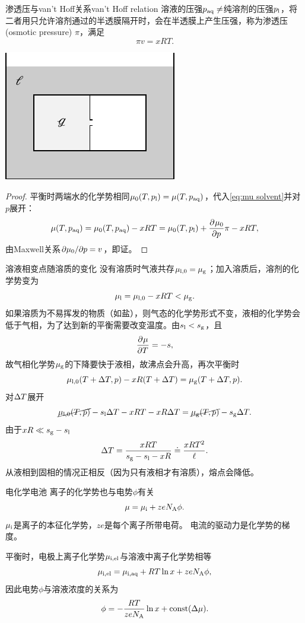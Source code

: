 \begin{theorem}
	{渗透压与van't Hoff关系}{van't Hoff relation}
	溶液的压强$p_{\mathrm{aq}}\neq$纯溶剂的压强$p_{\mathrm{l}}$，将二者用只允许溶剂通过的半透膜隔开时，会在半透膜上产生压强，称为渗透压(osmotic pressure) $\pi$，满足
	\begin{equation}
		\label{eq:van't Hoff}
		\pi v=xRT.
	\end{equation}
	\begin{center}
		\includegraphics[page=5]{figures/tikz/layouts.pdf}
	\end{center}
\end{theorem}

\begin{proof}
	平衡时两端水的化学势相同$\mu_0(T,p_{\mathrm{l}})=\mu(T,p_{\mathrm{aq}})$，代入\eqref{eq:mu solvent}并对$p$展开：
	\[
		\mu(T,p_{\mathrm{aq}})=\mu_0(T,p_{\mathrm{aq}})-xRT=\mu_0(T,p_{\mathrm{l}})+\frac{\partial^{{}}\mu_0}{\partial{p}^{{}}}\pi-xRT,
	\]
	由Maxwell关系$\partial\mu_0/\partial p=v$，即证。
\end{proof}

\begin{example}
	{溶液相变点随溶质的变化}{}
	没有溶质时气液共存$\mu_{\mathrm{l},0}=\mu_{\mathrm{g}}$；加入溶质后，溶剂的化学势变为
	\[
		\mu_{\mathrm{l}}=\mu_{\mathrm{l},0}-xRT<\mu_{\mathrm{g}}.
	\]
	如果溶质为不易挥发的物质（如盐），则气态的化学势形式不变，液相的化学势会低于气相，为了达到新的平衡需要改变温度。由$s_{\mathrm{l}}<s_{\mathrm{g}}$，且
	\[
		\frac{\partial^{{}}\mu}{\partial{T}^{{}}}=-s,
	\]
	故气相化学势$\mu_{\mathrm{g}}$的下降要快于液相，故沸点会升高，再次平衡时
	\[
		\mu_{\mathrm{l},0}(T+\Delta T,p)-xR(T+\Delta T)=\mu_{\mathrm{g}}(T+\Delta T,p).
	\]
	对$\Delta T$展开
	\[
		\cancel{\mu_{\mathrm{l},0}(T,p)}-s_{\mathrm{l}}\Delta T-xRT-xR\Delta T=\cancel{\mu_{\mathrm{g}}(T,p)}-s_{\mathrm{g}}\Delta T.
	\]
	由于$xR\ll s_{\mathrm{g}}-s_{\mathrm{l}}$
	\begin{equation}
		\Delta T=\frac{xRT}{s_{\mathrm{g}}-s_{\mathrm{l}}-xR}\doteq\frac{xRT^2}\ell.
	\end{equation}
	从液相到固相的情况正相反（因为只有液相才有溶质），熔点会降低。
\end{example}
\begin{example}
	{电化学电池}{}
	离子的化学势也与电势$\phi$有关
	\[
		\mu=\mu_{\mathrm{i}}+zeN_{\mathrm A}\phi.
	\]
	$\mu_{\mathrm{i}}$是离子的本征化学势，$ze$是每个离子所带电荷。
	电流的驱动力是化学势的梯度。
	
	平衡时，电极上离子化学势$\mu_{\mathrm{i},\mathrm{el}}$与溶液中离子化学势相等
	\[
		\mu_{\mathrm{i},\mathrm{el}}=\mu_{\mathrm{i},\mathrm{aq}}+RT\ln x+zeN_{\mathrm A}\phi,
	\]
	因此电势$\phi$与溶液浓度的关系为
	\[
		\phi=-\frac{RT}{zeN_{\mathrm A}}\ln x+\text{const}(\Delta\mu).
	\]
\end{example}

